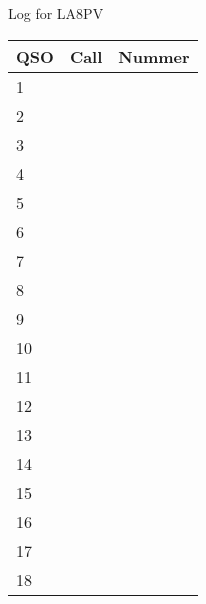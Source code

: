 \documentclass[a4paper]{article}
\begin{document}
\thispagestyle{empty}
\begin{centering}
\Huge
Log for LA8PV

\vspace{1cm}
\begin{tabular}{|p{}|p{}|p{}|}
	\hline
	\huge{QSO}& \huge{Call} & \huge{Nummer} \\  
	\hline
	1& &  \\
	\hline
	2& &  \\
	\hline
	3& &  \\
	\hline
	4& &  \\
	\hline
	5& &  \\
	\hline
	6& &  \\
	\hline
	7& &  \\
	\hline
	8& &  \\
	\hline
	9& &  \\
	\hline
	10& &  \\
	\hline
	11& &  \\
	\hline
	12& &  \\
	\hline
	13& &  \\
	\hline
	14& &  \\
	\hline
	15& &  \\
	\hline
	16& &  \\
	\hline
	17& &  \\
	\hline
	18& &  \\
	\hline
\end{tabular}
\end{centering}
\end{document}
